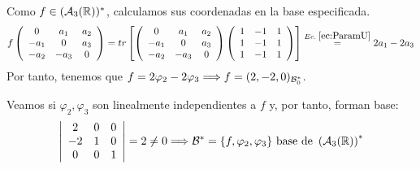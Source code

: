 \documentclass[12pt]{article}
\begin{document}
\begin{ejercicio}
\begin{enumerate}
        Como $f\in (\mathcal{A}_3(\mathbb{R}))^\ast$, calculamos sus coordenadas en la base especificada.
        \begin{equation*}
            f\left(\begin{array}{ccc}
                0 & a_1 & a_2 \\
                -a_1 & 0 & a_3 \\
                -a_2 & -a_3 & 0 \\
            \end{array}\right)
            =tr\left[
                \left(\begin{array}{ccc}
                    0 & a_1 & a_2 \\
                    -a_1 & 0 & a_3 \\
                    -a_2 & -a_3 & 0 \\
                \end{array}\right)
                \left(\begin{array}{ccc}
                    1 & -1 & 1 \\
                    1 & -1 & 1 \\
                    1 & -1 & 1
                \end{array}\right)
            \right] \stackrel{Ec.\;\ref{ec:ParamU}}{=} 2a_1 - 2a_3
        \end{equation*}
        Por tanto, tenemos que $f=2\varphi_2 -2\varphi_3 \Longrightarrow f=(2,-2,0)_{\mathcal{B}_0^\ast}$.

        Veamos si $\varphi_2, \varphi_3$ son linealmente independientes a $f$ y, por tanto, forman base:
        \begin{equation*}
            \left|\begin{array}{ccc}
                2 & 0 & 0\\
                -2 & 1 & 0 \\
                0 & 0 & 1
            \end{array}\right| = 2 \neq 0 \Longrightarrow \mathcal{B}^\ast = \{f,\varphi_2, \varphi_3\} \text{ base de } \left(\mathcal{A}_3(\mathbb{R})\right)^\ast
        \end{equation*}
        
    \end{enumerate}
\end{ejercicio}
\end{document}

